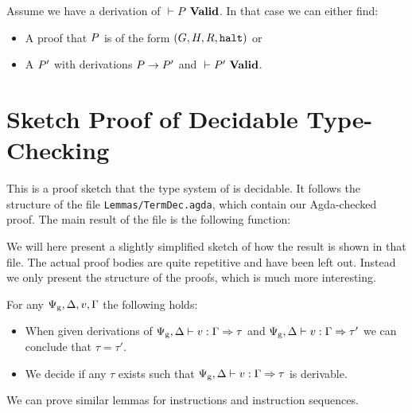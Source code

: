 \begin{theorem}
  Assume we have a derivation of ${} |- {P}\ \mathbf{Valid}$. In that case we can either
  find:
  \begin{itemize}
  \item A proof that $P$ is of the form
    $(G, H, R, \mathtt{halt})$ or
  \item A $P'$ with derivations ${P} -> {P'}$ and ${} |- {P'}\ \mathbf{Valid}$.
  \end{itemize}
\end{theorem}

\chapter{Sketch Proof of Decidable Type-Checking}
\label{sec:decproof}

This is a proof sketch that the type system of \ATAL is decidable. It follows
the structure of the file \texttt{Lemmas/TermDec.agda}, which contain our
Agda-checked proof. The main result of the file is the following function:

\begin{code}
\> \AgdaSymbol{:}     \AgdaSymbol{(}  \AgdaSymbol{)}\<%
\end{code}

We will here present a slightly simplified sketch of how the result is shown in
that file. The actual proof bodies are quite repetitive and have been left
out. Instead we only present the structure of the proofs, which is much more
interesting.

\begin{lemma}
  \label{lemma:dec-v}
  For any $\Psi_{\mathrm{g}},\Delta, v,\Gamma$ the following holds:

  \begin{itemize}
  \item When given derivations of
    ${\Psi_{\mathrm{g}},\Delta} |- {v} : {\Gamma => \tau}$ and
    ${\Psi_{\mathrm{g}},\Delta} |- {v} : {\Gamma => \tau'}$ we can
    conclude that $\tau = \tau'$.
  \item We decide if any $\tau$ exists such that
    ${\Psi_{\mathrm{g}},\Delta} |- {v} : {\Gamma => \tau}$ is derivable.
  \end{itemize}

  We can prove similar lemmas for instructions and instruction sequences.
\end{lemma}


